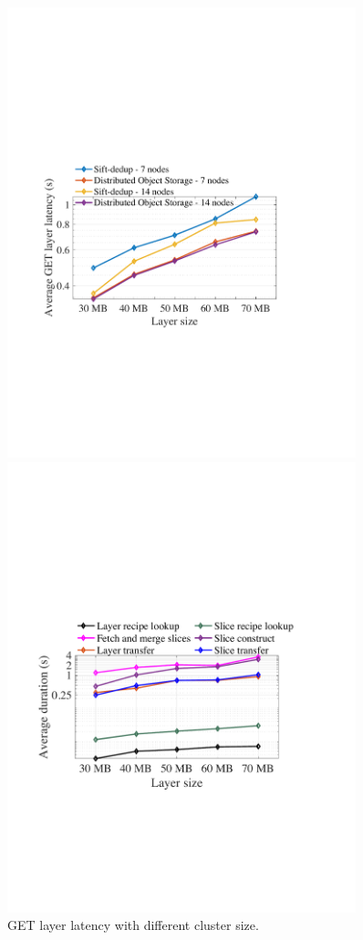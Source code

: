 \begin{figure}[t]
	\centering
	\begin{minipage}{0.3\textwidth}
		\centering
		\includegraphics[width=0.9\textwidth]{graphs/clusterscale.pdf}
		\caption{GET layer latency with different cluster size.}
		\label{fig:eval-clusterscale}
	\end{minipage}%
	\begin{minipage}{0.3\textwidth}
	\centering
	\includegraphics[width=0.9\textwidth]{graphs/restoringbreakdown.pdf}

\end{minipage}
\end{figure}

